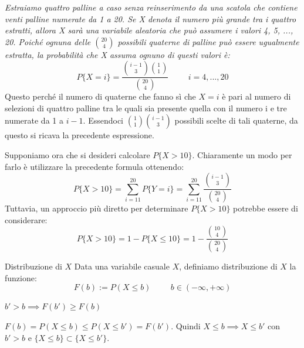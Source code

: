 \begin{Example}{}{}
    \textit{Estraiamo quattro palline a caso senza reinserimento da una scatola che contiene venti palline numerate da 1 a 20. Se X denota il numero più grande tra i quattro estratti, allora X sarà una variabile aleatoria che può assumere i valori 4, 5, ..., 20. Poiché ognuna delle $\binom{20}{4}$ possibili quaterne di palline può essere ugualmente estratta, la probabilità che X assuma ognuno di questi valori è:}
    \begin{equation*}
        P\{X=i\}=\frac{\binom{i-1}{3}\binom{1}{1}}{\binom{20}{4}}\hspace{1cm}i=4,...,20
    \end{equation*}
    Questo perché il numero di quaterne che fanno sì che $X = i$ è pari al numero di selezioni di quattro palline tra le quali sia presente quella con il numero i e tre numerate da 1 a $i - 1$. Essendoci $\binom{1}{1}\binom{i-1}{3}$ possibili scelte di tali quaterne, da questo si ricava la precedente espressione.
    
    Supponiamo ora che si desideri calcolare $P\{X > 10\}$. Chiaramente un modo per farlo è utilizzare la precedente formula ottenendo:
    \begin{equation*}
        P\{X>10\}=\sum^{20}_{i=11}P\{Y=i\}=\sum^{20}_{i=11}\frac{\binom{i-1}{3}}{\binom{20}{4}}
    \end{equation*}
    Tuttavia, un approccio più diretto per determinare $P\{X > 10\}$ potrebbe essere di considerare:
    \begin{equation*}
        P\{X > 10\} = 1 - P\{X \leq 10\} = 1 - \frac{\binom{10}{4}}{\binom{20}{4}}
    \end{equation*}
\end{Example}

\begin{Definition}{Distribuzione di $X$}{}
    Data una variabile casuale $X$, definiamo distribuzione di $X$ la funzione:
    \begin{equation*}
        F(b):=P(X\leq b)\hspace{1cm}b\in(-\infty,+\infty)
    \end{equation*}
\end{Definition}

\begin{Lemma}{}{}
    $b'>b\implies F(b')\geq F(b)$
    \begin{demonstration}
        $F(b)=P(X\leq b)\leq P(X\leq b')=F(b')$. Quindi $X\leq b\implies X\leq b'$ con $b'>b$ e $\{X\leq b\}\subset\{X\leq b'\}$.
    \end{demonstration}
\end{Lemma}

